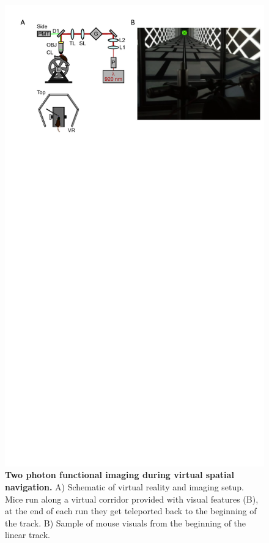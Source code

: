 \begin{figure}[h]
    \centering
    \includegraphics[trim={0 500 0 0},clip,width=\textwidth]{Figures/Chapter4/virtual_reality_setup.pdf}
    \caption[Two photon functional imaging during virtual spatial navigation.]{\textbf{Two photon functional imaging during virtual spatial navigation.} 
    A) Schematic of virtual reality and imaging setup. Mice run along a virtual corridor provided with visual features (B), at the end of each run they get teleported back to the beginning of the track. 
    B) Sample of mouse visuals from the beginning of the linear track.}
    \label{fig:chap4:virtual_reality_setup}
\end{figure}

